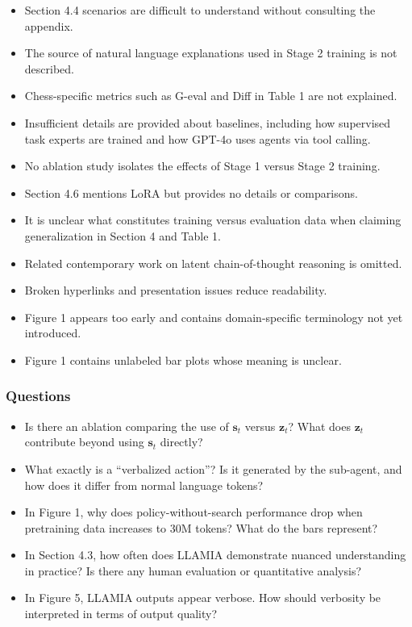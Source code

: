 \begin{itemize}
    \item Section 4.4 scenarios are difficult to understand without consulting the appendix.
    \item The source of natural language explanations used in Stage 2 training is not described.
    \item Chess-specific metrics such as G-eval and Diff in Table 1 are not explained.
    \item Insufficient details are provided about baselines, including how supervised task experts are trained and how GPT-4o uses agents via tool calling.
    \item No ablation study isolates the effects of Stage 1 versus Stage 2 training.
    \item Section 4.6 mentions LoRA but provides no details or comparisons.
    \item It is unclear what constitutes training versus evaluation data when claiming generalization in Section 4 and Table 1.
    \item Related contemporary work on latent chain-of-thought reasoning is omitted.
    \item Broken hyperlinks and presentation issues reduce readability.
    \item Figure 1 appears too early and contains domain-specific terminology not yet introduced.
    \item Figure 1 contains unlabeled bar plots whose meaning is unclear.
\end{itemize}

\subsubsection*{Questions}

\begin{itemize}
    \item Is there an ablation comparing the use of $\mathbf{s}_t$ versus $\mathbf{z}_t$? What does $\mathbf{z}_t$ contribute beyond using $\mathbf{s}_t$ directly?
    \item What exactly is a ``verbalized action''? Is it generated by the sub-agent, and how does it differ from normal language tokens?
    \item In Figure 1, why does policy-without-search performance drop when pretraining data increases to 30M tokens? What do the bars represent?
    \item In Section 4.3, how often does LLAMIA demonstrate nuanced understanding in practice? Is there any human evaluation or quantitative analysis?
    \item In Figure 5, LLAMIA outputs appear verbose. How should verbosity be interpreted in terms of output quality?
\end{itemize}


